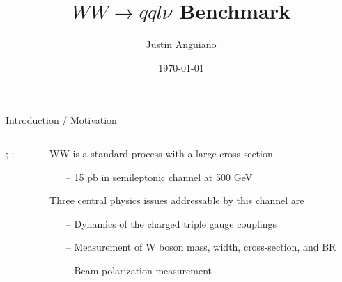 \documentclass[10pt]{beamer}
\author{Justin Anguiano}
\title{$WW\rightarrow qql\nu$ Benchmark}
\date{\today}
\begin{document}
\maketitle



\begin{frame}{Introduction / Motivation}

\begin{columns}
\begin{column}{0.5\textwidth}
;
    ;
\end{column}
\begin{column}{0.5\textwidth}
	WW is a standard process with a large cross-section 
		\begin{itemize}
		\scriptsize
		\item[--] 15 pb in semileptonic channel at 500 GeV
		\end{itemize} 
	Three central physics issues addressable by this channel are
		\begin{itemize}
		\scriptsize
		\item[--] Dynamics of the charged triple gauge couplings
		\item[--] Measurement of W boson mass, width, cross-section, and BR
		\item[--] Beam polarization measurement
		
		\end{itemize}
\end{column}
\end{columns}

\end{frame}
\end{document}
